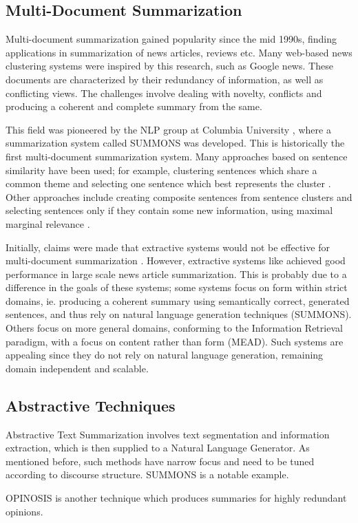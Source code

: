 \documentclass[BTech]{nitgoathesis}
\begin{document}
\subsection{Multi-Document Summarization}
Multi-document summarization gained popularity since the mid 1990s, finding applications in summarization of news articles, reviews etc. Many web-based news clustering systems were inspired by this research, such as Google news. These documents are characterized by their redundancy of information, as well as conflicting views. The challenges involve dealing with novelty, conflicts and producing a coherent and complete summary from the same.
\par
This field was pioneered by the NLP group at Columbia University \cite{mck}, where a summarization system called SUMMONS was developed. This is historically the first multi-document summarization system. Many approaches based on sentence similarity have been used; for example, clustering sentences which share a common theme and selecting one sentence which best represents the cluster \cite{mck}\cite{mead}. Other approaches include creating composite sentences from sentence clusters \cite{barz} and selecting sentences only if they contain some new information, using maximal marginal relevance \cite{carb}.
\par
Initially, claims were made that extractive systems would not be effective for multi-document summarization \cite{mck}\cite{mandall}. However, extractive systems like \cite{mead} achieved good performance in large scale news article summarization. This is probably due to a difference in the goals of these systems; some systems focus on form within strict domains, ie. producing a coherent summary using semantically correct, generated sentences, and thus rely on natural language generation techniques (SUMMONS). Others focus on more general domains, conforming to the Information Retrieval paradigm, with a focus on content rather than form (MEAD). Such systems are appealing since they do not rely on natural language generation, remaining domain independent and scalable.

\subsection{Abstractive Techniques}
Abstractive Text Summarization involves text segmentation and information extraction, which is then supplied to a Natural Language Generator. As mentioned before, such methods have narrow focus and need to be tuned according to discourse structure.
SUMMONS \cite{mck} is a notable example.
\par
OPINOSIS \cite{opn} is another technique which produces summaries for highly redundant opinions. 
\pagebreak
\end{document}
